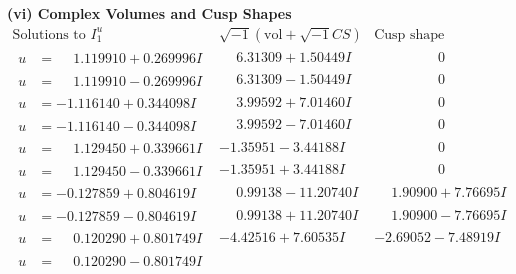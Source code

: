 \documentclass[1p]{elsarticle_modified}
\theoremstyle{definition}
\newcommand{\I}{\sqrt{-1}}
\begin{document}
\newpage\flushleft \textbf{(vi) Complex Volumes and Cusp Shapes}
$$\begin{array}{c|c|c}  
\text{Solutions to }I^u_{1}& \I (\text{vol} + \sqrt{-1}CS) & \text{Cusp shape}\\
 \hline 
\begin{aligned}
u &= \phantom{-}1.119910 + 0.269996 I\end{aligned}
 & \phantom{-}6.31309 + 1.50449 I & \phantom{-0.000000 } 0 \\ \hline\begin{aligned}
u &= \phantom{-}1.119910 - 0.269996 I\end{aligned}
 & \phantom{-}6.31309 - 1.50449 I & \phantom{-0.000000 } 0 \\ \hline\begin{aligned}
u &= -1.116140 + 0.344098 I\end{aligned}
 & \phantom{-}3.99592 + 7.01460 I & \phantom{-0.000000 } 0 \\ \hline\begin{aligned}
u &= -1.116140 - 0.344098 I\end{aligned}
 & \phantom{-}3.99592 - 7.01460 I & \phantom{-0.000000 } 0 \\ \hline\begin{aligned}
u &= \phantom{-}1.129450 + 0.339661 I\end{aligned}
 & -1.35951 - 3.44188 I & \phantom{-0.000000 } 0 \\ \hline\begin{aligned}
u &= \phantom{-}1.129450 - 0.339661 I\end{aligned}
 & -1.35951 + 3.44188 I & \phantom{-0.000000 } 0 \\ \hline\begin{aligned}
u &= -0.127859 + 0.804619 I\end{aligned}
 & \phantom{-}0.99138 - 11.20740 I & \phantom{-}1.90900 + 7.76695 I \\ \hline\begin{aligned}
u &= -0.127859 - 0.804619 I\end{aligned}
 & \phantom{-}0.99138 + 11.20740 I & \phantom{-}1.90900 - 7.76695 I \\ \hline\begin{aligned}
u &= \phantom{-}0.120290 + 0.801749 I\end{aligned}
 & -4.42516 + 7.60535 I & -2.69052 - 7.48919 I \\ \hline\begin{aligned}
u &= \phantom{-}0.120290 - 0.801749 I\end{aligned}

\end{array}$$
\end{document}
